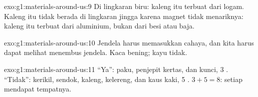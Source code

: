 \begin{solution}{exo:g1:materials-around-us:9}
Di lingkaran biru: kaleng itu terbuat dari logam. Kaleng itu tidak
berada di lingkaran jingga karena magnet tidak menariknya: kaleng itu
terbuat dari aluminium, bukan dari besi atau baja.
\end{solution}

\begin{solution}{exo:g1:materials-around-us:10}
Jendela harus memasukkan cahaya, dan kita harus dapat melihat menembus
jendela. Kaca bening; kayu tidak.
\end{solution}

\begin{solution}{exo:g1:materials-around-us:11}
``Ya'': paku, penjepit kertas, dan kunci, 3 . ``Tidak'': kerikil,
sendok, kaleng, kelereng, dan kaus kaki, 5 .
$3 + 5 = 8$: setiap  mendapat tempatnya.
\end{solution}
